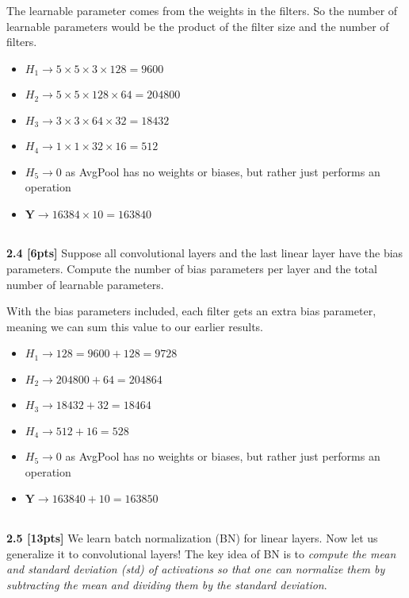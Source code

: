 \documentclass{article}
\begin{document}
{\color{blue}
The learnable parameter comes from the weights in the filters. So the number of learnable parameters would be the product of the filter size and the number of filters. 
\begin{itemize}
    \item $H_1 \rightarrow 5 \times 5 \times 3 \times 128=9600$
    \item $H_2 \rightarrow 5 \times 5 \times 128 \times 64=204800$
    \item $H_3 \rightarrow 3 \times 3 \times 64 \times 32=18432$
    \item $H_4 \rightarrow 1 \times 1 \times 32 \times 16=512$
    \item $H_5 \rightarrow 0$ as AvgPool has no weights or biases, but rather just performs an operation
    \item $\mathbf{Y} \rightarrow 16384 \times 10=163840$ 
\end{itemize}
}\\

\noindent
\textbf{2.4 [6pts]} Suppose all convolutional layers and the last linear layer have the bias parameters. Compute the number of bias parameters per layer and the total number of learnable parameters.\\

{\color{blue}
With the bias parameters included, each filter gets an extra bias parameter, meaning we can sum this value to our earlier results.
\begin{itemize}
    \item $H_1 \rightarrow 128=9600+128=9728$
    \item $H_2 \rightarrow 204800+64=204864$
    \item $H_3 \rightarrow 18432+32=18464$
    \item $H_4 \rightarrow 512+16=528$
    \item $H_5 \rightarrow 0$ as AvgPool has no weights or biases, but rather just performs an operation
    \item $\mathbf{Y} \rightarrow 163840+10=163850$ 
\end{itemize}
}\\

\noindent
\textbf{2.5 [13pts]} We learn batch normalization (BN) for linear layers. Now let us generalize it to convolutional layers! The key idea of BN is to \textit{compute the mean and standard deviation (std) of activations so that one can normalize them by subtracting the mean and dividing them by the standard deviation}.
\end{document}
